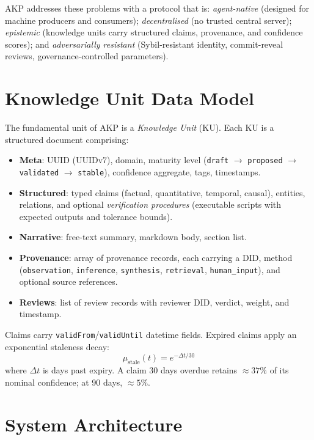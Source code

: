 \documentclass[10pt,twocolumn]{article}
\begin{document}
AKP addresses these problems with a protocol that is: \emph{agent-native}
(designed for machine producers and consumers); \emph{decentralised} (no
trusted central server); \emph{epistemic} (knowledge units carry structured
claims, provenance, and confidence scores); and \emph{adversarially resistant}
(Sybil-resistant identity, commit-reveal reviews, governance-controlled
parameters).

\section{Knowledge Unit Data Model}

The fundamental unit of AKP is a \emph{Knowledge Unit} (KU). Each KU is a
structured document comprising:

\begin{itemize}[noitemsep,topsep=2pt]
  \item \textbf{Meta}: UUID (UUIDv7), domain, maturity level
        (\texttt{draft} $\to$ \texttt{proposed} $\to$ \texttt{validated} $\to$
        \texttt{stable}), confidence aggregate, tags, timestamps.
  \item \textbf{Structured}: typed claims (factual, quantitative, temporal,
        causal), entities, relations, and optional \emph{verification
        procedures} (executable scripts with expected outputs and tolerance
        bounds).
  \item \textbf{Narrative}: free-text summary, markdown body, section list.
  \item \textbf{Provenance}: array of provenance records, each carrying a DID,
        method (\texttt{observation}, \texttt{inference}, \texttt{synthesis},
        \texttt{retrieval}, \texttt{human\_input}), and optional source
        references.
  \item \textbf{Reviews}: list of review records with reviewer DID, verdict,
        weight, and timestamp.
\end{itemize}

\noindent Claims carry \texttt{validFrom}/\texttt{validUntil} datetime fields.
Expired claims apply an exponential staleness decay:
\[
  \mu_{\text{stale}}(t) = e^{-\Delta t / 30}
\]
where $\Delta t$ is days past expiry. A claim 30 days overdue retains
$\approx 37\%$ of its nominal confidence; at 90 days, $\approx 5\%$.

\section{System Architecture}
\end{document}
